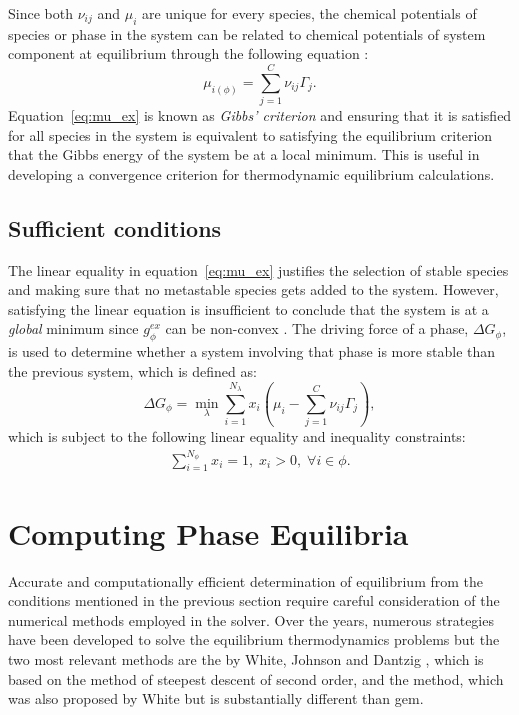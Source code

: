 \begin{enumerate}
		Since both $\nu_{ij}$ and $\mu_{i}$ are unique for every species, the chemical potentials of species or phase in the system can be related to chemical potentials of system component at equilibrium through the following equation \cite{vanZeggeren11}:
		\begin{equation}\label{eq:Gibbs_criterion}
			\mu_{i(\phi)} = \sum_{j=1}^{C}\nu_{ij}\Gamma_j.
		\end{equation}
		Equation~\eqref{eq:mu_ex} is known as \emph{Gibbs' criterion} and ensuring that it is satisfied for all species in the system is equivalent to satisfying the equilibrium criterion that the Gibbs energy of the system be at a local minimum. This is useful in developing a convergence criterion for thermodynamic equilibrium calculations.
	\end{enumerate}	
	
\subsection{Sufficient conditions}
	The linear equality in equation~\eqref{eq:mu_ex} justifies the selection of stable species and making sure that no metastable species gets added to the system. However, satisfying the linear equation is insufficient to conclude that the system is at a \emph{global} minimum since $g_{\phi}^{ex}$ can be non-convex \cite{Piro16}. The driving force of a phase, $\Delta G_{\phi} $, is used to determine whether a system involving that phase is more stable than the previous system, which is defined as:
	\begin{equation}
        		\Delta G_{\phi}= \min_{\lambda} \sum_{i=1}^{N_{\lambda}}x_{i} \left (\mu_{i} - \sum_{j=1}^C \nu_{ij}\Gamma_j \right ),
    	\end{equation}
	which is subject to the following linear equality and inequality constraints:
	\begin{align}
		\sum_{i=1}^{N_\phi} x_i = 1, \; x_i > 0, \; \forall i \in \phi.
	\end{align}
	

\section{Computing Phase Equilibria}
Accurate and computationally efficient determination of equilibrium from the conditions mentioned in the previous section require careful consideration of the numerical methods employed in the solver. Over the years, numerous strategies have been developed to solve the equilibrium thermodynamics problems but the two most relevant methods are the \emph{} by White, Johnson and Dantzig \cite{White:58}, which is based on the method of steepest descent of second order, and the \emph{} method, which was also proposed by White \cite{White67} but is substantially different than \gls{gem}.

